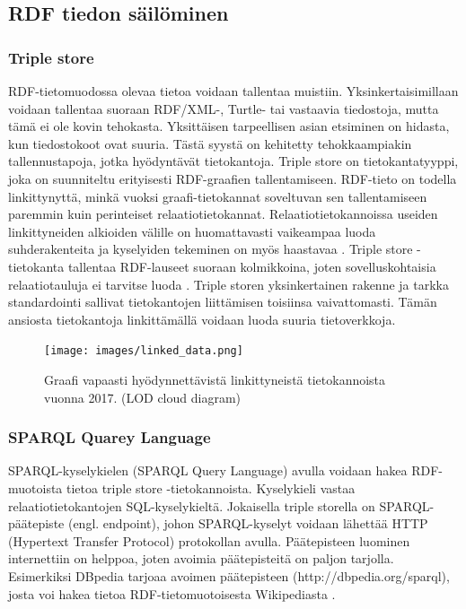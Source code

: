 \documentclass[finnish, 12pt, a4paper, elec, utf8, pdfa, online]{aaltothesis}
\begin{document}
{\subsection{RDF tiedon säilöminen}


\subsubsection{Triple store}
RDF-tietomuodossa olevaa tietoa voidaan tallentaa muistiin. Yksinkertaisimillaan voidaan tallentaa suoraan RDF/XML-, Turtle- tai vastaavia tiedostoja, mutta tämä ei ole kovin tehokasta. Yksittäisen tarpeellisen asian etsiminen on hidasta, kun tiedostokoot ovat suuria. Tästä syystä on kehitetty tehokkaampiakin tallennustapoja, jotka hyödyntävät tietokantoja. Triple store on tietokantatyyppi, joka on suunniteltu erityisesti RDF-graafien tallentamiseen. RDF-tieto on todella linkittynyttä, minkä vuoksi graafi-tietokannat soveltuvan sen tallentamiseen paremmin kuin perinteiset relaatiotietokannat. Relaatiotietokannoissa useiden linkittyneiden alkioiden välille on huomattavasti vaikeampaa luoda suhderakenteita ja kyselyiden tekeminen on myös haastavaa \cite{triplestore2}. Triple store -tietokanta tallentaa RDF-lauseet suoraan kolmikkoina, joten sovelluskohtaisia relaatiotauluja ei tarvitse luoda \cite{triplestore}. Triple storen yksinkertainen rakenne ja tarkka standardointi sallivat tietokantojen liittämisen toisiinsa vaivattomasti. Tämän ansiosta tietokantoja linkittämällä voidaan luoda suuria tietoverkkoja.


\begin{figure}[htb]
\centering
\texttt{[image: images/linked\_data.png]}
\caption{Graafi vapaasti hyödynnettävistä linkittyneistä tietokannoista vuonna 2017. (LOD cloud diagram) \cite{LOD_cloud} \label{images/linked_data}}
\end{figure}
\clearpage

\subsubsection{SPARQL Quarey Language}
SPARQL-kyselykielen (SPARQL Query Language) avulla voidaan hakea RDF-muotoista tietoa triple store -tietokannoista. Kyselykieli vastaa relaatiotietokantojen SQL-kyselykieltä. Jokaisella triple storella on SPARQL-päätepiste (engl. endpoint), johon SPARQL-kyselyt voidaan lähettää HTTP (Hypertext Transfer Protocol) protokollan avulla. Päätepisteen luominen internettiin on helppoa, joten avoimia päätepisteitä on paljon tarjolla. Esimerkiksi DBpedia tarjoaa avoimen päätepisteen (http://dbpedia.org/sparql), josta voi hakea tietoa RDF-tietomuotoisesta Wikipediasta \cite{Antoniou}.

}
\end{document}
